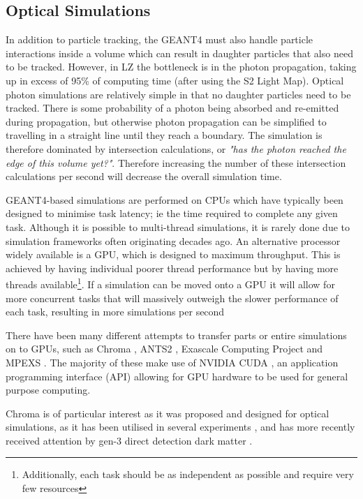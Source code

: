 \subsection{Optical Simulations}
\par
In addition to particle tracking, the GEANT4 must also handle particle interactions inside a volume which can result in daughter particles that also need to be tracked.
However, in LZ the bottleneck is in the photon propagation, taking up in excess of 95\% of computing time (after using the S2 Light Map).
Optical photon simulations are relatively simple in that no daughter particles need to be tracked.
There is some probability of a photon being absorbed and re-emitted during propagation, but otherwise photon propagation can be simplified to travelling in a straight line until they reach a boundary.
The simulation is therefore dominated by intersection calculations, or \textit{"has the photon reached the edge of this volume yet?"}.
Therefore increasing the number of these intersection calculations per second will decrease the overall simulation time.
\par
GEANT4-based simulations are performed on CPUs which have typically been designed to minimise task latency; ie the time required to complete any given task.
Although it is possible to multi-thread simulations, it is rarely done due to simulation frameworks often originating decades ago.
An alternative processor widely available is a GPU, which is designed to maximum throughput.
This is achieved by having individual poorer thread performance but by having more threads available\footnote{Additionally, each task should be as independent as possible and require very few resources}.
If a simulation can be moved onto a GPU it will allow for more concurrent tasks that will massively outweigh the slower performance of each task, resulting in more simulations per second
\par
There have been many different attempts to transfer parts or entire simulations on to GPUs, such as Chroma \cite{chroma_whitepaper_ref}, ANTS2 \cite{ants2_whitepaper_ref}, Exascale Computing Project \cite{ExaSMR_whitepaper_ref} and MPEXS \cite{mpexs_whitepaper_ref}.
The majority of these make use of NVIDIA CUDA \cite{cuda_ref}, an application programming interface (API) allowing for GPU hardware to be used for general purpose computing.
\par
Chroma is of particular interest as it was proposed and designed for optical simulations, as it has been utilised in several experiments \cite{chroma_with_tpcs1_ref,chroma_with_tpcs2_ref,chroma_with_tpcs3_ref}, and has more recently received attention by gen-3 direct detection dark matter \cite{DARWIN_GPU_simulations_2022_ref}.
